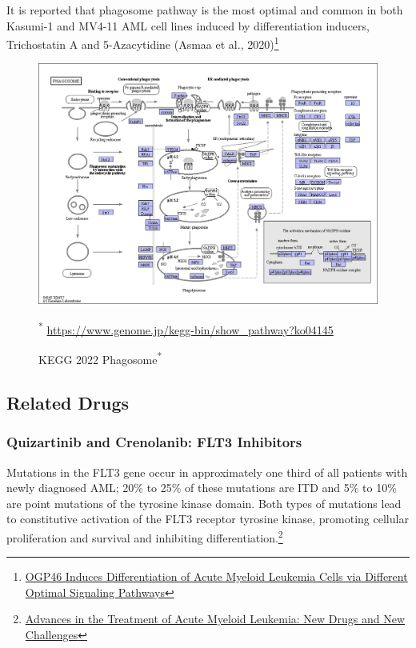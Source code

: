 \documentclass[11pt]{article}
\begin{document}
It is reported that phagosome pathway is the most optimal and common in
both Kasumi-1 and MV4-11 AML cell lines induced by differentiation
inducers, Trichostatin A and 5-Azacytidine (Asmaa et al.,
2020)\footnote{\href{https://www.frontiersin.org/articles/10.3389/fcell.2021.652972/full}{OGP46
  Induces Differentiation of Acute Myeloid Leukemia Cells via Different
  Optimal Signaling Pathways}}
\begin{figure}
        \begin{center}
            \includegraphics[width=\linewidth]{figs/ko04145.png}
            \caption{KEGG 2022 Phagosome\textsuperscript{*}}
            \tiny\textsuperscript{*} \url{https://www.genome.jp/kegg-bin/show_pathway?ko04145}
            \label{fig:kegg-2022-phagosome}
        \end{center}
\end{figure}
    \hypertarget{related-drugs}{%
\subsection{Related Drugs}\label{related-drugs}}

\hypertarget{quizartinib-and-crenolanib-flt3-inhibitors}{%
\subsubsection{Quizartinib and Crenolanib: FLT3
Inhibitors}\label{quizartinib-and-crenolanib-flt3-inhibitors}}

Mutations in the FLT3 gene occur in approximately one third of all
patients with newly diagnosed AML; 20\% to 25\% of these mutations are
ITD and 5\% to 10\% are point mutations of the tyrosine kinase domain.
Both types of mutations lead to constitutive activation of the FLT3
receptor tyrosine kinase, promoting cellular proliferation and survival
and inhibiting differentiation.\footnote{\href{https://aacrjournals.org/cancerdiscovery/article/10/4/506/2495/Advances-in-the-Treatment-of-Acute-Myeloid}{Advances
  in the Treatment of Acute Myeloid Leukemia: New Drugs and New
  Challenges}}
\end{document}
